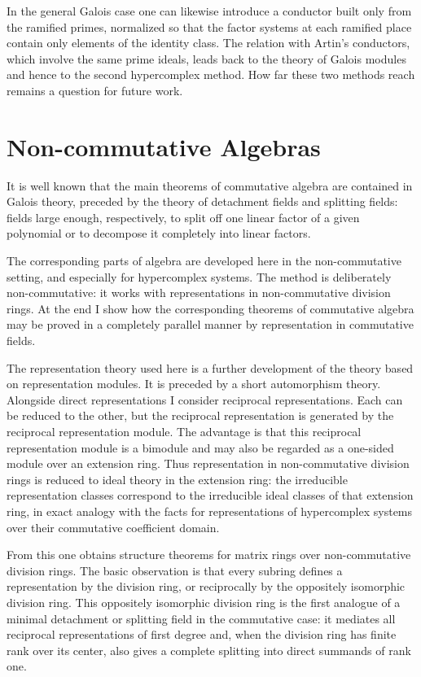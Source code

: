 \documentclass[
  11pt,
]{article}
\begin{document}
In the general Galois case one can likewise introduce a conductor built
only from the ramified primes, normalized so that the factor systems at
each ramified place contain only elements of the identity class. The
relation with Artin's conductors, which involve the same prime ideals,
leads back to the theory of Galois modules and hence to the second
hypercomplex method. How far these two methods reach remains a question
for future work.

\section{Non-commutative Algebras}\label{non-commutative-algebras}

It is well known that the main theorems of commutative algebra are
contained in Galois theory, preceded by the theory of detachment fields
and splitting fields: fields large enough, respectively, to split off
one linear factor of a given polynomial or to decompose it completely
into linear factors.

The corresponding parts of algebra are developed here in the
non-commutative setting, and especially for hypercomplex systems. The
method is deliberately non-commutative: it works with representations in
non-commutative division rings. At the end I show how the corresponding
theorems of commutative algebra may be proved in a completely parallel
manner by representation in commutative fields.

The representation theory used here is a further development of the
theory based on representation modules. It is preceded by a short
automorphism theory. Alongside direct representations I consider
reciprocal representations. Each can be reduced to the other, but the
reciprocal representation is generated by the reciprocal representation
module. The advantage is that this reciprocal representation module is a
bimodule and may also be regarded as a one-sided module over an
extension ring. Thus representation in non-commutative division rings is
reduced to ideal theory in the extension ring: the irreducible
representation classes correspond to the irreducible ideal classes of
that extension ring, in exact analogy with the facts for representations
of hypercomplex systems over their commutative coefficient domain.

From this one obtains structure theorems for matrix rings over
non-commutative division rings. The basic observation is that every
subring defines a representation by the division ring, or reciprocally
by the oppositely isomorphic division ring. This oppositely isomorphic
division ring is the first analogue of a minimal detachment or splitting
field in the commutative case: it mediates all reciprocal
representations of first degree and, when the division ring has finite
rank over its center, also gives a complete splitting into direct
summands of rank one.
\end{document}
